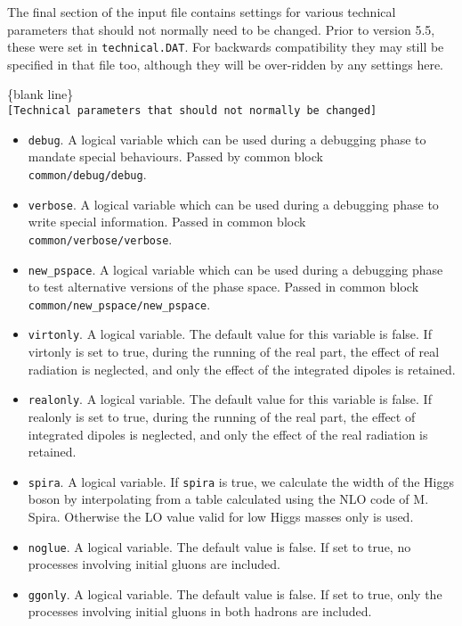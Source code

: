 \documentclass[12pt]{article}
\begin{document}
The final section of the input file contains settings for various technical parameters that should not normally need to be changed. Prior to version 5.5, these were set in {\tt technical.DAT}. For backwards compatibility they may still be specified in that file too, although they will be over-ridden by any settings here.
\begin{center}
\{blank line\} \\
{\tt [Technical parameters that should not normally be changed]}
\end{center}
\begin{itemize}
\item {\tt debug}.  
A logical variable which can be used during a 
debugging phase to mandate special behaviours. 
Passed by common block \\
{\tt common/debug/debug}.
\item {\tt verbose}.  
A logical variable which can be used during a debugging phase to write 
special information. Passed in common block \\
{\tt common/verbose/verbose}.
\item {\tt new\_pspace}.  
A logical variable which can be used during a debugging phase to test alternative versions of the phase space.
Passed in common block {\tt common/new\_pspace/new\_pspace}.
\item {\tt virtonly}.  
A logical variable. The default value for this variable is false.
If virtonly is set to true, during the running of the real part,
the effect of real radiation is neglected, and only the effect of the
integrated dipoles is retained. 
\item {\tt realonly}.  
A logical variable. The default value for this variable is false.
If realonly is set to true, during the running of the real part,
the effect of integrated dipoles is neglected, and only the effect of the
real radiation is retained. 
\item {\tt spira}.  
A logical variable. If {\tt spira} is true, we calculate the 
width of the Higgs boson by interpolating from a table
calculated using the NLO code of M. Spira.
Otherwise the LO value valid for low Higgs masses only is used.
\item {\tt noglue}.  
A logical variable. 
The default value is false. If set to true, no processes
involving initial gluons are included.
\item {\tt ggonly}.  
A logical variable. 
The default value is false. If set to true, 
only the processes
involving initial gluons in both hadrons are included.

\end{itemize}
\end{document}
